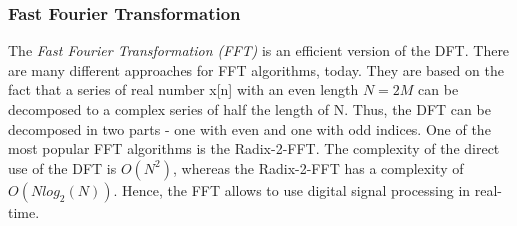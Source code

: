\subsubsection{Fast Fourier Transformation}
The \textit{Fast Fourier Transformation (FFT)} is an efficient version of the DFT. There are many different approaches for FFT algorithms, today. They are based on the fact that a series of real number x[n] with an even length $N=2M$ can be decomposed to a complex series of half the length of N. Thus, the DFT can be decomposed in two parts - one with even and one with odd indices. One of the most popular FFT algorithms is the Radix-2-FFT. The complexity of the direct use of the DFT is $O(N^2)$, whereas the Radix-2-FFT has a complexity of $O(N log_2(N))$. Hence, the FFT allows to use digital signal processing in real-time. 



